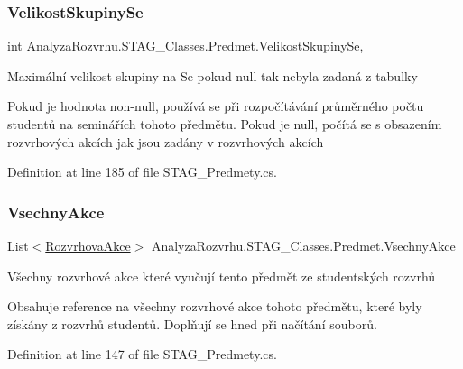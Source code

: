 \subsubsection{\texorpdfstring{Velikost\+Skupiny\+Se}{VelikostSkupinySe}}
{\footnotesize\ttfamily int Analyza\+Rozvrhu.\+S\+T\+A\+G\+\_\+\+Classes.\+Predmet.\+Velikost\+Skupiny\+Se\hspace{0.3cm}{\ttfamily [get]}, {\ttfamily [set]}}



Maximální velikost skupiny na Se pokud null tak nebyla zadaná z tabulky 

Pokud je hodnota non-\/null, používá se při rozpočítávání průměrného počtu studentů na seminářích tohoto předmětu. Pokud je null, počítá se s obsazením rozvrhových akcích jak jsou zadány v rozvrhových akcích

Definition at line 185 of file S\+T\+A\+G\+\_\+\+Predmety.\+cs.

\mbox{\label{class_analyza_rozvrhu_1_1_s_t_a_g___classes_1_1_predmet_a2ee96fae2d567cd70cd44b27d6a70ae5}} 
\subsubsection{\texorpdfstring{Vsechny\+Akce}{VsechnyAkce}}
{\footnotesize\ttfamily List$<$\hyperlink{class_analyza_rozvrhu_1_1_s_t_a_g___classes_1_1_rozvrhova_akce}{Rozvrhova\+Akce}$>$ Analyza\+Rozvrhu.\+S\+T\+A\+G\+\_\+\+Classes.\+Predmet.\+Vsechny\+Akce\hspace{0.3cm}{\ttfamily [get]}}



Všechny rozvrhové akce které vyučují tento předmět ze studentských rozvrhů 

Obsahuje reference na všechny rozvrhové akce tohoto předmětu, které byly získány z rozvrhů studentů. Doplňují se hned při načítání souborů.

Definition at line 147 of file S\+T\+A\+G\+\_\+\+Predmety.\+cs.

\mbox{\label{class_analyza_rozvrhu_1_1_s_t_a_g___classes_1_1_predmet_ad2eb29ac9108bc34d12730af5b3e57b5}} 
